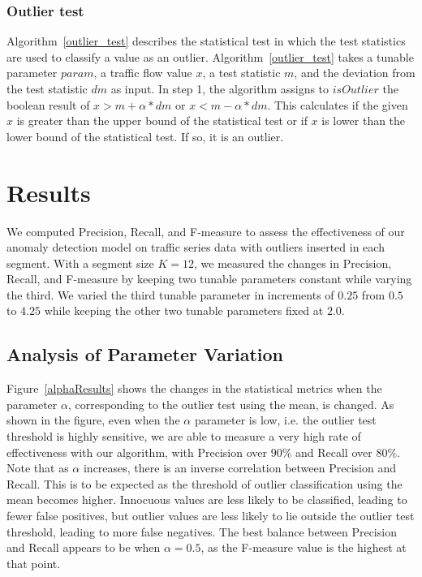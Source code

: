 \documentclass[conference]{IEEEtran}
\begin{document}
\subsubsection{Outlier test}Algorithm~\ref{outlier_test} describes the statistical test in which the test statistics are used to classify a value as an outlier. Algorithm~\ref{outlier_test} takes a tunable parameter $param$, a traffic flow value $x$, a test statistic $m$, and the deviation from the test statistic $dm$ as input. In step 1, the algorithm assigns to $isOutlier$ the boolean result of $x > m + \alpha * dm$ or $x < m - \alpha * dm$. This calculates if the given $x$ is greater than the upper bound of the statistical test or if $x$ is lower than the lower bound of the statistical test. If so, it is an outlier.
   

%
%
\section{Results}
\label{results}
We computed Precision, Recall, and F-measure to assess the effectiveness of our anomaly detection model on traffic series data with outliers inserted in each segment. With a segment size $K = 12$, we measured the changes in Precision, Recall, and F-measure by keeping two tunable parameters constant while varying the third. We varied the third tunable parameter in increments of $0.25$ from $0.5$ to $4.25$ while keeping the other two tunable parameters fixed at $2.0$.

\subsection{Analysis of Parameter Variation} Figure~\ref{alphaResults} shows the changes in the statistical metrics when the parameter $\alpha$, corresponding to the outlier test using the mean, is changed. As shown in the figure, even when the $\alpha$ parameter is low, i.e. the outlier test threshold is highly sensitive, we are able to measure a very high rate of effectiveness with our algorithm, with Precision over $90\%$ and Recall over $80\%$. Note that as $\alpha$ increases, there is an inverse correlation between Precision and Recall. This is to be expected as the threshold of outlier classification using the mean becomes higher. Innocuous values are less likely to be classified, leading to fewer false positives, but outlier values are less likely to lie outside the outlier test threshold, leading to more false negatives. The best balance between Precision and Recall appears to be when $\alpha = 0.5$, as the F-measure value is the highest at that point.
\end{document}
